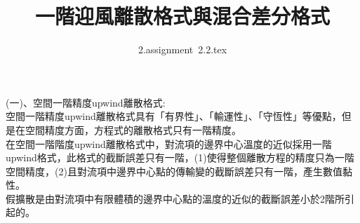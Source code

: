 \documentclass[12pt]{article}
\title{一階迎風離散格式與混合差分格式}
\author{2.assignment\ 2.2.tex}
\begin{document}
 
\maketitle 
\noindent (一)、空間一階精度upwind離散格式:\\

空間一階精度upwind離散格式具有「有界性」、「輸運性」、「守恆性」等優點，但是在空間精度方面，方程式的離散格式只有一階精度。\\

在空間一階階度upwind離散格式中，對流項的邊界中心溫度的近似採用一階upwind格式，此格式的截斷誤差只有一階，(1)使得整個離散方程的精度只為一階空間精度，(2)且對流項中邊界中心點的傳輸變的截斷誤差只有一階，產生數值黏性。\\
假擴散是由對流項中有限體積的邊界中心點的溫度的近似的截斷誤差小於2階所引起的。\\
\end{document}
